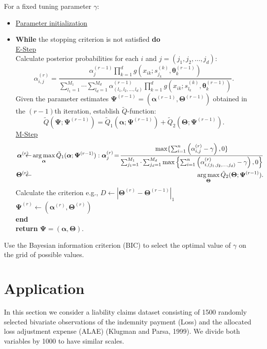 \documentclass[11pt]{article}
\def\argmax{\operatornamewithlimits{arg\,max}}
\def\a{\alpha} \def\b{\beta}
\def\argmax{\operatornamewithlimits{arg\,max}}
\def\bea{\begin{eqnarray*}} \def\eea{\end{eqnarray*}}
\begin{document}
\begin{algorithm}
\caption{Penalized EM algorithm}
For a fixed tuning parameter $\gamma$:
\begin{itemize}
\item [] \underline{Parameter initialization}
\item [] \textbf{While} the stopping criterion is not satisfied \textbf{do}\\
\underline{E-Step}\\
Calculate posterior probabilities for each $i$ and $j = (j_1,j_2,\ldots,j_d)$: 
$$
\a^{(r)}_{i,j} = \frac{\a^{(r-1)}_{j} \prod_{k=1}^d g(x_{ik};s^{(k)}_{j_k}, \bm{\theta}^{(r-1)}_k)}{\sum_{l_1 = 1}^{M_1} \cdots\sum_{l_d = 1}^{M_d}\a^{(r-1)}_{(l_1,l_2,\ldots,l_d)} \prod_{k=1}^d g(x_{ik};s^{(k)}_{l_k}, \bm{\theta}^{(r-1)}_k)}.
$$
Given the parameter estimates $\bm{\Psi}^{(r-1)} = (\bm{\a}^{(r-1)}, \bm{\Theta}^{(r-1)})$ obtained in the $(r-1)$th iteration, establish $\tilde{Q}$-function:
$$
\tilde{Q}(\bm{\Psi};\bm{\Psi}^{(r-1)}) = \tilde{Q}_1(\bm{\a};\bm{\Psi}^{(r-1)})  + \tilde{Q}_2(\bm{\Theta};\bm{\Psi}^{(r-1)}). 
$$
\underline{M-Step}
\bea
\bm{\a}^{(r)}\!\!\!\!\!&\leftarrow&\!\!\!\!\!  \argmax_{\bm{\a}} \tilde{Q}_1(\bm{\a};\bm{\Psi}^{(r-1)}): \bm{\a}^{(r)}_{j}\!=\! \frac{\max\{\sum_{i=1}^n \left(\a^{(r)}_{i,j}-\gamma\right), 0\}}{\sum_{j_1 = 1}^{M_1}\cdot\sum_{j_d = 1}^{M_d} \max\left\{\sum_{i=1}^n \left(\a^{(r)}_{i,(j_1,j_2,\ldots,j_d)}-\gamma\right), 0 \right\}}\\
\bm{\Theta}^{(r)}\!\!\!\!\!&\leftarrow&\!\!\!\!\! \argmax_{\bm{\Theta}} \tilde{Q}_2(\bm{\Theta};\bm{\Psi}^{(r-1)}).
\eea
Calculate the criterion e.g., $D \leftarrow |\bm{\Theta}^{(r)} - \bm{\Theta}^{(r-1)}|_1$ \\
$\bm{\Psi}^{(r)} \leftarrow (\bm{\a}^{(r)}, \bm{\Theta}^{(r)})$\\
\textbf{end}\\
\textbf{return} $\bm{\Psi} = (\bm{\a}, \bm{\Theta})$.
\end{itemize}
Use the Bayesian information criterion (BIC) to select the optimal value of $\gamma$ on the grid of possible values.
\end{algorithm}


\section{Application}\label{sec5}
In this section we consider a liability claims dataset consisting of 1500 randomly selected bivariate observations of the indemnity payment (Loss) and the allocated loss adjustment expense (ALAE) (Klugman and Parsa, 1999). We divide both variables by 1000 to have similar scales. 
\end{document}
